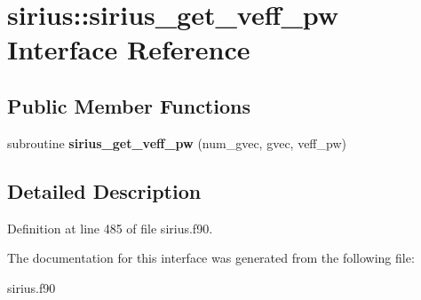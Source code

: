 \hypertarget{interfacesirius_1_1sirius__get__veff__pw}{}\section{sirius\+:\+:sirius\+\_\+get\+\_\+veff\+\_\+pw Interface Reference}
\label{interfacesirius_1_1sirius__get__veff__pw}
\subsection*{Public Member Functions}
\begin{DoxyCompactItemize}
\item 
\hypertarget{interfacesirius_1_1sirius__get__veff__pw_af31057f29466122364b7df97d4e5b20d}{}subroutine {\bfseries sirius\+\_\+get\+\_\+veff\+\_\+pw} (num\+\_\+gvec, gvec, veff\+\_\+pw)\label{interfacesirius_1_1sirius__get__veff__pw_af31057f29466122364b7df97d4e5b20d}

\end{DoxyCompactItemize}


\subsection{Detailed Description}


Definition at line 485 of file sirius.\+f90.



The documentation for this interface was generated from the following file\+:\begin{DoxyCompactItemize}
\item 
sirius.\+f90\end{DoxyCompactItemize}
